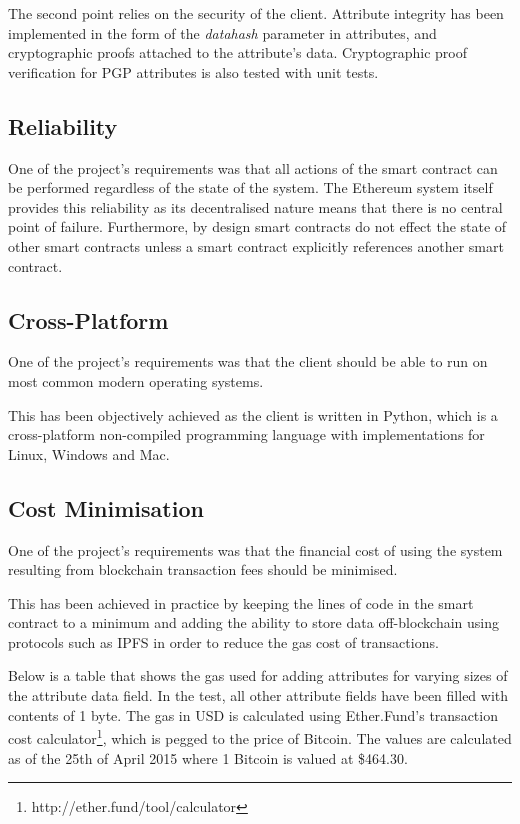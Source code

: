 \documentclass[12pt]{report}
\begin{document}
	The second point relies on the security of the client. Attribute integrity has been implemented in the form of the \textit{datahash} parameter in attributes, and cryptographic proofs attached to the attribute's data. Cryptographic proof verification for PGP attributes is also tested with unit tests.
	
	\subsection{Reliability}
	One of the project's requirements was that all actions of the smart contract can be performed regardless of the state of the system. The Ethereum system itself provides this reliability as its decentralised nature means that there is no central point of failure. Furthermore, by design smart contracts do not effect the state of other smart contracts unless a smart contract explicitly references another smart contract.
	
	\subsection{Cross-Platform}
	One of the project's requirements was that the client should be able to run on most common modern operating systems.
	
	This has been objectively achieved as the client is written in Python, which is a cross-platform non-compiled programming language with implementations for Linux, Windows and Mac.\cite{25}
	
	\subsection{Cost Minimisation}
	One of the project's requirements was that the financial cost of using the system resulting from blockchain transaction fees should be minimised.
	
	This has been achieved in practice by keeping the lines of code in the smart contract to a minimum and adding the ability to store data off-blockchain using protocols such as IPFS in order to reduce the gas cost of transactions.
	
	Below is a table that shows the gas used for adding attributes for varying sizes of the attribute data field. In the test, all other attribute fields have been filled with contents of 1 byte. The gas in USD is calculated using Ether.Fund's transaction cost calculator\footnote{http://ether.fund/tool/calculator}, which is pegged to the price of Bitcoin. The values are calculated as of the 25th of April 2015 where 1 Bitcoin is valued at \$464.30.
	
\end{document}
